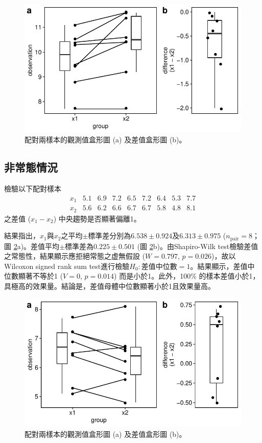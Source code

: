 \documentclass[12pt, a4paper, onecolumn]{article}
\begin{document}
\begin{figure}[htb]
	\centering
	\includegraphics[]{normal_paired_test.pdf}
	\caption{配對兩樣本的觀測值盒形圖 (a) 及差值盒形圖 (b)。}
	\label{fig:normal_paired_test}
\end{figure}

\subsection{非常態情況}
檢驗以下配對樣本
\[
\begin{matrix}
x_1 & 5.1 & 6.9 & 7.2 & 6.5 & 7.2 & 6.4 & 5.3 & 7.7 \\
x_2 & 5.6 & 6.2 & 6.6 & 6.7 & 6.7 & 5.8 & 4.8 & 8.1
\end{matrix}
\]
之差值 ($x_1 - x_2$) 中央趨勢是否顯著偏離1。

結果指出，$x_1$與$x_2$之平均$\pm$標準差分別為$6.538 \pm 0.924$及$6.313 \pm 0.975$ ($n_\mathrm{pair} = 8$；圖 \ref{fig:non-normal_paired_test}a)。差值平均$\pm$標準差為$0.225\pm0.501$ (圖 \ref{fig:non-normal_paired_test}b)。由Shapiro-Wilk test檢驗差值之常態性，結果顯示應拒絕常態之虚無假設 ($W = 0.797$, $p = 0.026$)，故以Wilcoxon signed rank sum test進行檢驗$H_0: \text{差值中位數}=1$。結果顯示，差值中位數顯著不等於1 ($V = 0$, $p = 0.014$) 而是小於1。此外，100\% 的樣本差值小於1，具極高的效果量。結論是，差值母體中位數顯著小於1且效果量高。

\begin{figure}[htb]
	\centering
	\includegraphics[]{non-normal_paired_test.pdf}
	\caption{配對兩樣本的觀測值盒形圖 (a) 及差值盒形圖 (b)。}
	\label{fig:non-normal_paired_test}
\end{figure}
\end{document}
